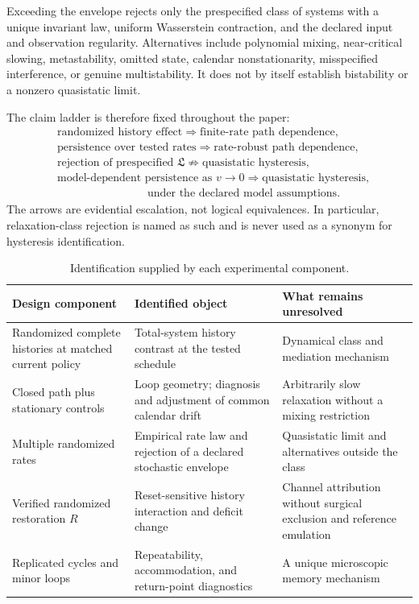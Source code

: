 \documentclass[10pt,a4paper]{article}
\begin{document}
Exceeding the envelope rejects only the prespecified class of systems with a unique invariant law, uniform Wasserstein contraction, and the declared input and observation regularity. Alternatives include polynomial mixing, near-critical slowing, metastability, omitted state, calendar nonstationarity, misspecified interference, or genuine multistability. It does not by itself establish bistability or a nonzero quasistatic limit.

The claim ladder is therefore fixed throughout the paper:
\begin{equation}
\begin{aligned}
&\text{randomized history effect}
  \Rightarrow \text{finite-rate path dependence},\\
&\text{persistence over tested rates}
  \Rightarrow \text{rate-robust path dependence},\\
&\text{rejection of prespecified }\mathfrak L
  \not\Rightarrow \text{quasistatic hysteresis},\\
&\text{model-dependent persistence as }v\to0
  \Rightarrow \text{quasistatic hysteresis},\\
&\hspace{8em}\text{under the declared model assumptions}.
\end{aligned}
\label{eq:claim-ladder}
\end{equation}
The arrows are evidential escalation, not logical equivalences. In particular, relaxation-class rejection is named as such and is never used as a synonym for hysteresis identification.

\begin{table}[!htbp]
\centering
\caption{Identification supplied by each experimental component.}
\label{tab:identification}
\small
\begin{tabularx}{\textwidth}{|p{3.2cm}|Y|Y|}
\hline
\textbf{Design component} & \textbf{Identified object} & \textbf{What remains unresolved}\\
\hline
Randomized complete histories at matched current policy & Total-system history contrast at the tested schedule & Dynamical class and mediation mechanism\\
\hline
Closed path plus stationary controls & Loop geometry; diagnosis and adjustment of common calendar drift & Arbitrarily slow relaxation without a mixing restriction\\
\hline
Multiple randomized rates & Empirical rate law and rejection of a declared stochastic envelope & Quasistatic limit and alternatives outside the class\\
\hline
Verified randomized restoration $R$ & Reset-sensitive history interaction and deficit change & Channel attribution without surgical exclusion and reference emulation\\
\hline
Replicated cycles and minor loops & Repeatability, accommodation, and return-point diagnostics & A unique microscopic memory mechanism\\
\hline
\end{tabularx}
\end{table}
\end{document}
